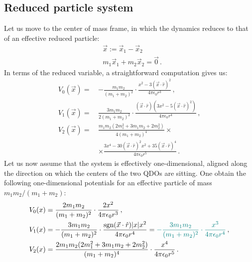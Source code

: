 \documentclass[reprint, amsmath, amssymb, aps, prl]{revtex4-2}
\begin{document}
    \subsection{Reduced particle system}

        Let us move to the center of mass frame, in which the dynamics reduces to that of an effective reduced particle:
        \begin{subequations}
        \begin{align}
            &\vec x:=\vec x_1 - \vec x_2\\
            &m_1\vec x_1 + m_2\vec x_2 = \vec 0\,.
        \end{align}
        \end{subequations}
        In terms of the reduced variable, a straightforward computation gives us:
        \begin{subequations}
        \begin{align}
            V_0(\vec x)=\,&-\frac{m_1m_2}{(m_1+m_2)^2}\cdot\frac{ x^2-3(\vec x\cdot\hat r)^2}{4\pi\epsilon_0r^3}\,,\\
            V_1(\vec x)=\,&\frac{3m_1m_2}{2(m_1+m_2)^2}\cdot\frac{(\vec x\cdot\hat r)\left(3x^2 - 5(\vec x\cdot\hat r)^2\right)}{4\pi\epsilon_0r^4}\,,\\
            V_2(\vec x)=\,&\frac{m_1m_2(2m_1^2+3m_1m_2+2m_2^2)}{4(m_1+m_2)^4}\times\\
            &\times\frac{3x^4 - 30(\vec x\cdot\hat r)^2 x^2+35(\vec x\cdot\hat r)^4}{4\pi\epsilon_0r^5}\nonumber\,.
        \end{align}
        \end{subequations}
        Let us now assume that the system is effectively one-dimensional, aligned along the direction on which the centers of the two QDOs are sitting. One obtain the following one-dimensional potentials for an effective particle of mass $m_1m_2 / (m_1+m_2)$:
        \begin{subequations}
        \begin{align}
            V_0(x)&=\frac{2m_1m_2}{(m_1+m_2)^2}\cdot\frac{2 x^2}{4\pi\epsilon_0r^3}\,,\\
            V_1(x)&=-\frac{3m_1m_2}{(m_1+m_2)^2}\cdot\frac{\text{sgn}(\vec x\cdot\hat r)|x|x^2}{4\pi\epsilon_0r^4}=\mathbin{\textcolor{teal}{-\frac{3m_1m_2}{(m_1+m_2)^2}\cdot\frac{x^3}{4\pi\epsilon_0r^4}}}\,,\\
            V_2(x)&=\frac{2m_1m_2(2m_1^2+3m_1m_2+2m_2^2)}{(m_1+m_2)^4}\cdot\frac{x^4}{4\pi\epsilon_0r^5}\,.
        \end{align}
        \end{subequations}
\end{document}
